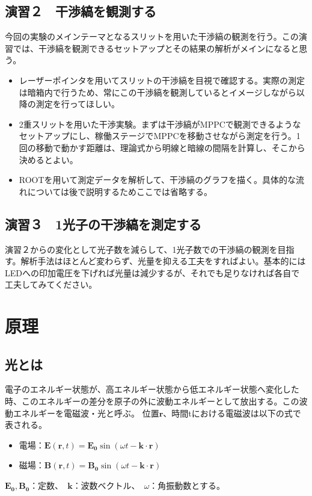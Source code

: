 \documentclass[uplatex,10pt,a4j]{jsarticle}
\begin{document}
\subsection{演習２　干渉縞を観測する}
今回の実験のメインテーマとなるスリットを用いた干渉縞の観測を行う。この演習では、干渉縞を観測できるセットアップとその結果の解析がメインになると思う。
\begin{itemize}
  \item レーザーポインタを用いてスリットの干渉縞を目視で確認する。実際の測定は暗箱内で行うため、常にこの干渉縞を観測しているとイメージしながら以降の測定を行ってほしい。
  \item 2重スリットを用いた干渉実験。まずは干渉縞がMPPCで観測できるようなセットアップにし、稼働ステージでMPPCを移動させながら測定を行う。1回の移動で動かす距離は、理論式から明線と暗線の間隔を計算し、そこから決めるとよい。
  \item ROOTを用いて測定データを解析して、干渉縞のグラフを描く。具体的な流れについては後で説明するためここでは省略する。
\end{itemize}

\subsection{演習３　1光子の干渉縞を測定する}
演習２からの変化として光子数を減らして、1光子数での干渉縞の観測を目指す。解析手法はほとんど変わらず、光量を抑える工夫をすればよい。基本的にはLEDへの印加電圧を下げれば光量は減少するが、それでも足りなければ各自で工夫してみてください。

\clearpage
\section{原理}

\subsection{光とは}
電子のエネルギー状態が、高エネルギー状態から低エネルギー状態へ変化した時、このエネルギーの差分を原子の外に波動エネルギーとして放出する。この波動エネルギーを電磁波・光と呼ぶ。
位置$\bm{r}$、時間tにおける電磁波は以下の式で表される。
\begin{itemize}
  \item 電場：$\bm{E} (\bm{r}, t) = \bm{E_0} \sin (\omega t - \bm{k} \cdot \bm{r} ) $
  \item 磁場：$\bm{B} (\bm{r}, t) = \bm{B_0} \sin (\omega t - \bm{k} \cdot \bm{r} ) $
\end{itemize}
$\bm{E_0}, \bm{B_0}$：定数、　$\bm{k}$：波数ベクトル、　$\omega$：角振動数とする。
\end{document}

